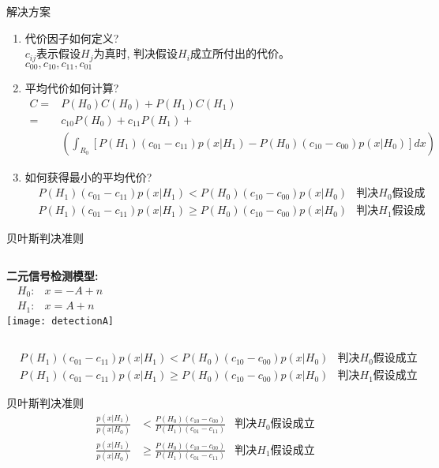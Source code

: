 \begin{frame}{解决方案}
\begin{enumerate}
	\item 代价因子如何定义? \\
	$c_{ij}$表示假设$H_j$为真时, 判决假设$H_i$成立所付出的代价。\\
	$c_{00}, c_{10}, c_{11}, c_{01}$
	\item 平均代价如何计算?
	\begin{align*}
	C=&P(H_0)C(H_0)+P(H_1)C(H_1)\\
	=&c_{10}P(H_0)+c_{11}P(H_1)+\\
	&\left(\int_{R_0}\left[P({H_1})(c_{01}-c_{11})p(x|H_1)-P(H_0)(c_{10}-c_{00})p(x|H_0)\right]dx \right)
	\end{align*}
	\item 如何获得最小的平均代价?
	\begin{align*}
	&P({H_1})(c_{01}-c_{11})p(x|H_1)< P(H_0)(c_{10}-c_{00})p(x|H_0)&\textbf{判决$H_0$假设成立}\\
	&P({H_1})(c_{01}-c_{11})p(x|H_1)\ge P(H_0)(c_{10}-c_{00})p(x|H_0)&\textbf{判决$H_1$假设成立}
	\end{align*}
\end{enumerate}
\end{frame}

\begin{frame}[shrink]{贝叶斯判决准则}
\begin{columns}%
	\textbf{二元信号检测模型:}
	\begin{align*}
	H_0: &x=-A+n\\
	H_1: &x=A+n
	\end{align*}
	\texttt{[image: detectionA]}
\end{columns}
\begin{align*}
&P({H_1})(c_{01}-c_{11})p(x|H_1)< P(H_0)(c_{10}-c_{00})p(x|H_0)&\textbf{判决$H_0$假设成立}\\
&P({H_1})(c_{01}-c_{11})p(x|H_1)\ge P(H_0)(c_{10}-c_{00})p(x|H_0)&\textbf{判决$H_1$假设成立}
\end{align*}
\begin{block}{贝叶斯判决准则}
	\begin{align*}
	\frac{p(x|H_1)}{p(x|H_0)}&<\frac{P(H_0)(c_{10}-c_{00})}{P(H_1)(c_{01}-c_{11})}&\textbf{判决$H_0$假设成立}\\
	\frac{p(x|H_1)}{p(x|H_0)}&\ge\frac{P(H_0)(c_{10}-c_{00})}{P(H_1)(c_{01}-c_{11})}&\textbf{判决$H_1$假设成立}
	\end{align*}
\end{block}
\end{frame}

